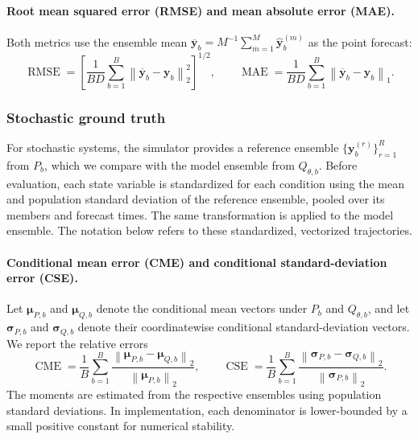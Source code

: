 \paragraph{Root mean squared error (RMSE) and mean absolute error (MAE).}
Both metrics use the ensemble mean
$\overline{\mathbf y}_b=M^{-1}\sum_{m=1}^{M}
\widehat{\mathbf y}_b^{(m)}$ as the point forecast:
\begin{equation}
  \operatorname{RMSE}
  =
  \left[
    \frac{1}{BD}\sum_{b=1}^{B}
    \left\|\overline{\mathbf y}_b-\mathbf y_b\right\|_2^2
  \right]^{1/2},
  \qquad
  \operatorname{MAE}
  =
  \frac{1}{BD}\sum_{b=1}^{B}
  \left\|\overline{\mathbf y}_b-\mathbf y_b\right\|_1.
  \label{eq:rmse-mae}
\end{equation}

\subsubsection{Stochastic ground truth}

For stochastic systems, the simulator provides a reference ensemble
$\{\mathbf y_b^{(r)}\}_{r=1}^{R}$ from $P_b$, which we compare with the model
ensemble from $Q_{\theta,b}$.  Before evaluation, each state variable is
standardized for each condition using the mean and population standard
deviation of the reference ensemble, pooled over its members and forecast
times.  The same transformation is applied to the model ensemble.  The
notation below refers to these standardized, vectorized trajectories.

\paragraph{Conditional mean error (CME) and conditional standard-deviation
error (CSE).}
Let $\boldsymbol{\mu}_{P,b}$ and $\boldsymbol{\mu}_{Q,b}$ denote the conditional
mean vectors under $P_b$ and $Q_{\theta,b}$, and let
$\boldsymbol{\sigma}_{P,b}$ and $\boldsymbol{\sigma}_{Q,b}$ denote their
coordinatewise conditional standard-deviation vectors.  We report the
relative errors
\begin{equation}
  \operatorname{CME}
  =
  \frac{1}{B}\sum_{b=1}^{B}
  \frac{\left\|\boldsymbol{\mu}_{P,b}-\boldsymbol{\mu}_{Q,b}\right\|_2}
       {\left\|\boldsymbol{\mu}_{P,b}\right\|_2},
  \qquad
  \operatorname{CSE}
  =
  \frac{1}{B}\sum_{b=1}^{B}
  \frac{\left\|\boldsymbol{\sigma}_{P,b}-\boldsymbol{\sigma}_{Q,b}\right\|_2}
       {\left\|\boldsymbol{\sigma}_{P,b}\right\|_2}.
  \label{eq:cme-cse}
\end{equation}
The moments are estimated from the respective ensembles using population
standard deviations.  In implementation, each denominator is lower-bounded
by a small positive constant for numerical stability.

